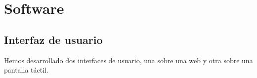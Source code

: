 \section{Software}
\subsection{Interfaz de usuario}

Hemos desarrollado dos interfaces de usuario, una sobre una web y otra sobre una pantalla táctil.







